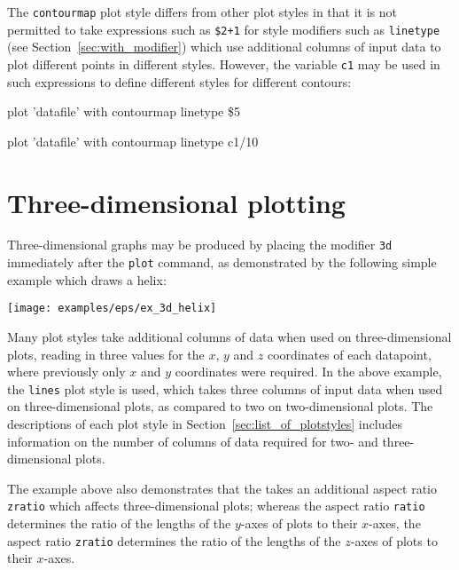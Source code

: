 The {\tt contourmap} plot style differs from other plot styles in that it is
not permitted to take expressions such as {\tt \$2+1} for style modifiers such
as {\tt linetype} (see Section~\ref{sec:with_modifier}) which use additional
columns of input data to plot different points in different styles. However,
the variable {\tt c1} may be used in such expressions to define different
styles for different contours:

\begin{dontdo}
plot 'datafile' with contourmap linetype \$5
\end{dontdo}

\begin{dodo}
plot 'datafile' with contourmap linetype c1/10
\end{dodo}

\section{Three-dimensional plotting}
\label{sec:threedim}

Three-dimensional graphs may be produced by placing the modifier {\tt 3d}
immediately after the {\tt plot} command, as demonstrated by the following
simple example which draws a helix:

\vspace{2mm}

\vspace{2mm}
\centerline{\texttt{[image: examples/eps/ex\_3d\_helix]}}
\vspace{2mm}

Many plot styles take additional columns of data when used on
three-dimen\-sional plots, reading in three values for the $x$, $y$ and $z$
coordinates of each datapoint, where previously only $x$ and $y$ coordinates
were required. In the above example, the {\tt lines} plot style is used, which
takes three columns of input data when used on three-dimensional plots, as
compared to two on two-dimensional plots.  The descriptions of each plot style
in Section~\ref{sec:list_of_plotstyles} includes information on the number of
columns of data required for two- and three-dimensional plots. 

The example above also demonstrates that the  takes an
additional aspect ratio {\tt zratio} which affects three-dimensional plots;
whereas the aspect ratio {\tt ratio} determines the ratio of the lengths of the
$y$-axes of plots to their $x$-axes, the aspect ratio {\tt zratio} determines
the ratio of the lengths of the $z$-axes of plots to their $x$-axes.

